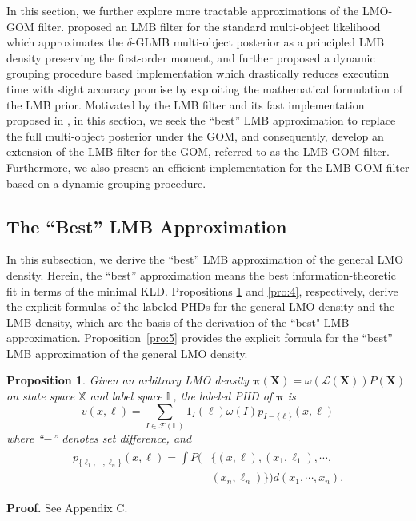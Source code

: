 \documentclass[journal]{IEEEtran}
\newcommand{\bX}{{\mathbf X}}
\newcommand{\bpi}{{\boldsymbol\pi}}
\newtheorem{Pro}{Proposition}
\newcommand{\proproof}[1]{\noindent\textbf{Proof. } See Appendix #1.}
\begin{document}
{ In this section, we further explore  more tractable approximations of the LMO-GOM filter.  \cite{refr:label_5} proposed an LMB  filter for the standard multi-object likelihood which approximates the $\delta$-GLMB multi-object posterior as a principled LMB density preserving the first-order moment, and further proposed a dynamic grouping procedure based implementation  which drastically reduces execution time with slight accuracy promise by exploiting the mathematical formulation of the LMB prior.
Motivated by the LMB filter  and its fast implementation proposed in \cite{refr:label_5}, in this section, we seek the ``best'' LMB   approximation to   replace the full  multi-object posterior under the GOM, and consequently,  develop an extension of the LMB filter for  the GOM,  referred to as the LMB-GOM filter.  Furthermore, we also present an efficient implementation   for the  LMB-GOM filter based on a dynamic grouping procedure. 
 
 


\subsection{The ``Best'' LMB Approximation}
In this subsection,  we  derive  the ``best'' LMB approximation of the general LMO density.   Herein, the ``best'' approximation means the  best information-theoretic fit in terms of the minimal KLD. Propositions \ref{pro:3} and \ref{pro:4}, respectively, derive the explicit formulas of the labeled PHDs for the general LMO density and the LMB density, which are the basis of  the derivation of the ``best" LMB approximation.  Proposition~\ref{pro:5}  provides the explicit formula for the  ``best'' LMB  approximation of the general LMO density.
\begin{Pro}\label{pro:3}
Given an arbitrary LMO density $\bpi(\bX)=\omega(\mathcal{L}(\bX))P(\bX)$ on state space $\mathbb{X}$ and label space $\mathbb{L}$, the labeled PHD of $\bpi$ is
\begin{equation}\label{labeled-PHD-LMO}
v(x,\ell)={\sum}_{I\in\mathcal{F}(\mathbb{L})}1_{I}(\ell)\omega(I)p_{I-\{\ell\}}(x,\ell)
\end{equation} 
where ``$-$'' denotes set difference, and 
\begin{align}
\label{marginal_label}
\begin{split}
p_{\{\ell_1,\cdots,\ell_n\}}(x,\ell) =\int  P(&\{(x,\ell),(x_1,\ell_1),\cdots,\\ &(x_n,\ell_n)\})  d(x_1,\cdots,x_n).
\end{split}
\end{align} 
\end{Pro}
\proproof{C}





}
\end{document}

